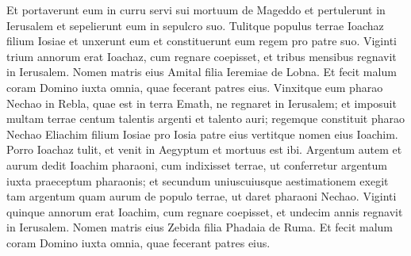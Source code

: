 \begin{biblechapter}
\verse Et portaverunt eum in curru servi sui mortuum de Mageddo et pertulerunt in Ierusalem et sepelierunt eum in sepulcro suo. Tulitque populus terrae Ioachaz filium Iosiae et unxerunt eum et constituerunt eum regem pro patre suo. 
\verse Viginti trium annorum erat Ioachaz, cum regnare coepisset, et tribus mensibus regnavit in Ierusalem. Nomen matris eius Amital filia Ieremiae de Lobna. 
\verse Et fecit malum coram Domino iuxta omnia, quae fecerant patres eius. 
\verse Vinxitque eum pharao Nechao in Rebla, quae est in terra Emath, ne regnaret in Ierusalem; et imposuit multam terrae centum talentis argenti et talento auri;  
\verse regemque constituit pharao Nechao Eliachim filium Iosiae pro Iosia patre eius vertitque nomen eius Ioachim. Porro Ioachaz tulit, et venit in Aegyptum et mortuus est ibi. 
\verse Argentum autem et aurum dedit Ioachim pharaoni, cum indixisset terrae, ut conferretur argentum iuxta praeceptum pharaonis; et secundum uniuscuiusque aestimationem exegit tam argentum quam aurum de populo terrae, ut daret pharaoni Nechao. 
\verse Viginti quinque annorum erat Ioachim, cum regnare coepisset, et undecim annis regnavit in Ierusalem. Nomen matris eius Zebida filia Phadaia de Ruma. 
\verse Et fecit malum coram Domino iuxta omnia, quae fecerant patres eius. 
\end{biblechapter}

